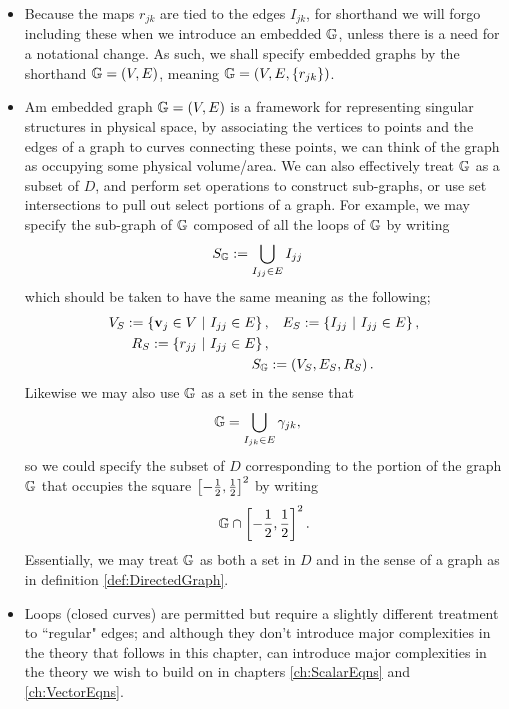 \begin{itemize}
	\item Because the maps $r_{jk}$ are tied to the edges $I_{jk}$, for shorthand we will forgo including these when we introduce an embedded $\mathbb{G}$, unless there is a need for a notational change.
	As such, we shall specify embedded graphs by the shorthand $\mathbb{G}=\left( V,E \right)$, meaning $\mathbb{G}=\left( V, E, \left\{ r_{jk} \right\} \right)$.
	\item Am embedded graph $\mathbb{G} = \left( V,E \right)$ is a framework for representing singular structures in physical space, by associating the vertices to points and the edges of a graph to curves connecting these points, we can think of the graph as occupying some physical volume/area.
	We can also effectively treat $\mathbb{G}$ as a subset of $D$, and perform set operations to construct sub-graphs, or use set intersections to pull out select portions of a graph.
	For example, we may specify the sub-graph of $\mathbb{G}$ composed of all the loops of $\mathbb{G}$ by writing
	\begin{align*}
		S_{\mathbb{G}} &:= \bigcup_{I_{jj}\in E} I_{jj}
	\end{align*}
	which should be taken to have the same meaning as the following;
	\begin{align*}
		V_S := \left\{ \mathbf{v}_j\in V \ \vert \ I_{jj}\in E \right\}, &\quad E_S := \left\{ I_{jj} \ \vert \ I_{jj}\in E \right\}, \\
		R_S := \left\{ r_{jj} \ \vert \ I_{jj}\in E \right\}, &\\
		S_{\mathbb{G}} &:= \left( V_S, E_S, R_S \right).
	\end{align*}
	Likewise we may also use $\mathbb{G}$ as a set in the sense that
	\begin{align*}
		\mathbb{G} &= \bigcup_{I_{jk}\in E} \gamma_{jk},
	\end{align*}
	so we could specify the subset of $D$ corresponding to the portion of the graph $\mathbb{G}$ that occupies the square $\left[ -\frac{1}{2},\frac{1}{2} \right]^2$ by writing
	\begin{align*}
		\mathbb{G} \cap \left[ -\frac{1}{2},\frac{1}{2} \right]^2.
	\end{align*}
	Essentially, we may treat $\mathbb{G}$ as both a set in $D$ and in the sense of a graph as in definition \ref{def:DirectedGraph}.
	\item Loops (closed curves) are permitted but require a slightly different treatment to ``regular" edges; and although they don't introduce major complexities in the theory that follows in this chapter, can introduce major complexities in the theory we wish to build on in chapters \ref{ch:ScalarEqns} and \ref{ch:VectorEqns}.
\end{itemize}

